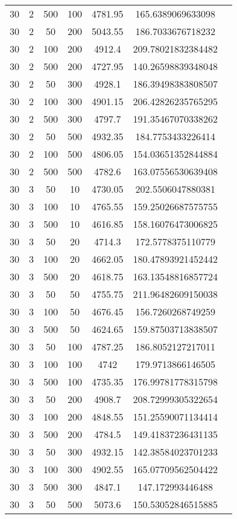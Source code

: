 {\begin{longtabu}{S
S
S
S
S
S[round-mode=places, round-precision=0]
S[round-mode=places, round-precision=0]}
30 & 2 & 500 & 100 & 4781.95 & 165.6389069633098 \\
30 & 2 & 50 & 200 & 5043.55 & 186.7033676718232 \\
30 & 2 & 100 & 200 & 4912.4 & 209.78021832384482 \\
30 & 2 & 500 & 200 & 4727.95 & 140.26598839348048 \\
30 & 2 & 50 & 300 & 4928.1 & 186.39498383808507 \\
30 & 2 & 100 & 300 & 4901.15 & 206.42826235765295 \\
30 & 2 & 500 & 300 & 4797.7 & 191.35467070338262 \\
30 & 2 & 50 & 500 & 4932.35 & 184.7753433226414 \\
30 & 2 & 100 & 500 & 4806.05 & 154.03651352844884 \\
30 & 2 & 500 & 500 & 4782.6 & 163.07556530639408 \\
30 & 3 & 50 & 10 & 4730.05 & 202.5506047880381 \\
30 & 3 & 100 & 10 & 4765.55 & 159.25026687575755 \\
30 & 3 & 500 & 10 & 4616.85 & 158.16076473006825 \\
30 & 3 & 50 & 20 & 4714.3 & 172.5778375110779 \\
30 & 3 & 100 & 20 & 4662.05 & 180.47893921452442 \\
30 & 3 & 500 & 20 & 4618.75 & 163.13548816857724 \\
30 & 3 & 50 & 50 & 4755.75 & 211.96482609150038 \\
30 & 3 & 100 & 50 & 4676.45 & 156.7260268749259 \\
30 & 3 & 500 & 50 & 4624.65 & 159.87503713838507 \\
30 & 3 & 50 & 100 & 4787.25 & 186.8052127217011 \\
30 & 3 & 100 & 100 & 4742 & 179.9713866146505 \\
30 & 3 & 500 & 100 & 4735.35 & 176.99781778315798 \\
30 & 3 & 50 & 200 & 4908.7 & 208.72999305322654 \\
30 & 3 & 100 & 200 & 4848.55 & 151.25590071134414 \\
30 & 3 & 500 & 200 & 4784.5 & 149.41837236431135 \\
30 & 3 & 50 & 300 & 4932.15 & 142.38584023701233 \\
30 & 3 & 100 & 300 & 4902.55 & 165.07709562504422 \\
30 & 3 & 500 & 300 & 4847.1 & 147.172993446488 \\
30 & 3 & 50 & 500 & 5073.6 & 150.53052846515885 \\

\end{longtabu}}
